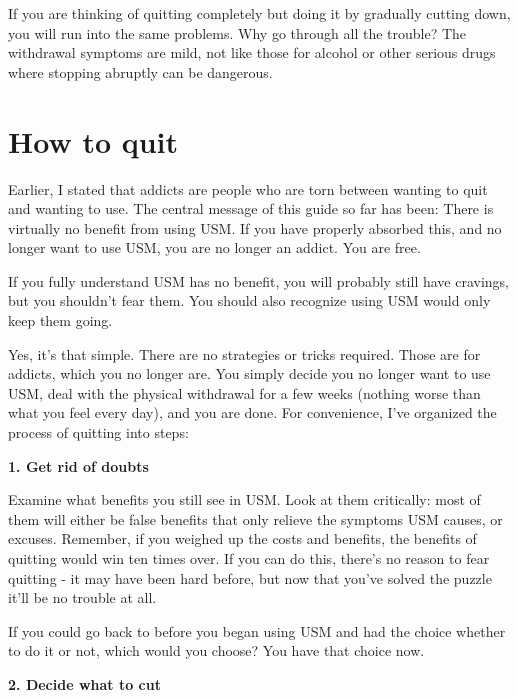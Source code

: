 \documentclass[
  openany]{book}
\newenvironment{rmdnote}{
\color{blue}
\begin{framed}}{\end{framed}}
\begin{document}
If you are thinking of quitting completely but doing it by gradually cutting down, you will run into the same problems. Why go through all the trouble? The withdrawal symptoms are mild, not like those for alcohol or other serious drugs where stopping abruptly can be dangerous.

\chapter{How to quit}\label{how-to-quit}

Earlier, I stated that addicts are people who are torn between wanting to quit and wanting to use. The central message of this guide so far has been: There is virtually no benefit from using USM. If you have properly absorbed this, and no longer want to use USM, you are no longer an addict. You are free.

\begin{rmdnote}
If you fully understand USM has no benefit, you will probably still have cravings, but you shouldn't fear them. You should also recognize using USM would only keep them going.

\end{rmdnote}

Yes, it's that simple. There are no strategies or tricks required. Those are for addicts, which you no longer are. You simply decide you no longer want to use USM, deal with the physical withdrawal for a few weeks (nothing worse than what you feel every day), and you are done. For convenience, I've organized the process of quitting into steps:

\textbf{1. Get rid of doubts}

Examine what benefits you still see in USM. Look at them critically: most of them will either be false benefits that only relieve the symptoms USM causes, or excuses. Remember, if you weighed up the costs and benefits, the benefits of quitting would win ten times over. If you can do this, there's no reason to fear quitting - it may have been hard before, but now that you've solved the puzzle it'll be no trouble at all.

\begin{rmdnote}
If you could go back to before you began using USM and had the choice whether to do it or not, which would you choose? You have that choice now.

\end{rmdnote}

\textbf{2. Decide what to cut}
\end{document}
